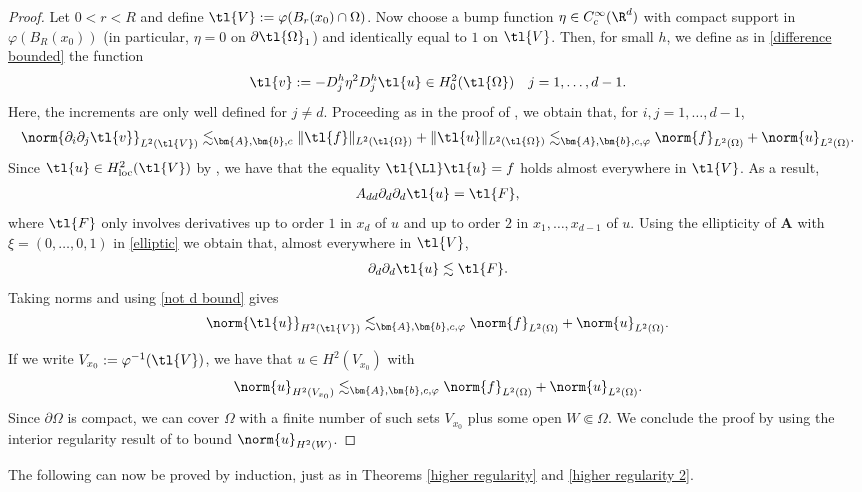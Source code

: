 \documentclass[
    a4paper,
    DIV=14,
    abstract=true,
    numbers=noenddot
]{scrartcl}
\begin{document}
\begin{proof}
    Let $0<r<R$ and define  $\tl{V}:= \varphi(B_r(x_0) \cap \Omega )$. Now choose a bump function $\eta \in C_c^\infty(\R^d) $ with compact support in $\varphi (B_R(x_0))$ (in particular, $\eta =0$ on $\partial \tl{\Omega }_1 $) and identically equal to $1$ on $\tl{V}$. Then, for small $h$,  we define as in \eqref{difference bounded} the function
    \begin{align*}
        \tl{v} := -D_j^h \eta^2 D_j^h \tl{u} \in H^2_0(\tl{\Omega }) \quad j=1,\ldots,d-1.
    \end{align*}
    Here, the increments are only well defined for $j \neq d$. Proceeding as in the proof of , we obtain that, for $i,j=1,\ldots,d-1$,
    \begin{align}\label{not d bound}
        \norm{\partial_i \partial _j \tl{v}}_{L^2(\tl{V} )} \lesssim_{\bm{A}, \bm{b}, c} \|\tl{f}\|_{L^2(\tl{\Omega })}+\|\tl{u}\|_{L^2(\tl{\Omega })} \lesssim_{\bm{A}, \bm{b}, c, \varphi } \norm{f}_{L^2(\Omega)}+\norm{u}_{L^2(\Omega)}.
    \end{align}
    Since $\tl{u} \in H^2_{\mathrm{loc}}(\tl{V} )$ by , we have that the equality $\tl{\Ll }\tl{u}=f  $ holds almost everywhere in $\tl{V} $. As a result,
    \begin{align*}
        A_{dd} \partial_d\partial_d \tl{u}= \tl{F},
    \end{align*}
    where $\tl{F}$ only involves derivatives up to order $1$ in $x_d$ of $u$ and up to order $2$ in $x_1,\dots, x_{d-1}$ of $u$. Using  the ellipticity of $\bm{A}$ with $\xi=(0,\dots,0,1)$ in \eqref{elliptic} we obtain that, almost everywhere in $\tl{V} $,
    \begin{align*}
        \partial_d\partial_d \tl{u} \lesssim \tl{F}.
    \end{align*}
    Taking norms and using \eqref{not d bound} gives
    \begin{align*}
        \norm{\tl{u} }_{H^2(\tl{V} )} \lesssim_{\bm{A},\bm{b},c, \varphi } \norm{f}_{L^2(\Omega)}+\norm{u }_{L^2(\Omega)}.
    \end{align*}


    If we write $V_{x_0}:= \varphi ^{-1} (\tl{V} )$, we have that $u \in H^2(V_{x_0})$ with
    \begin{align*}
        \norm{u}_{H^2(V_{x_0})} \lesssim_{\bm{A},\bm{b},c, \varphi } \norm{f}_{L^2(\Omega)}+\norm{u}_{L^2(\Omega)}.
    \end{align*}
    Since $\partial \Omega $ is compact, we can cover $\Omega $  with a finite number of such sets $V_{x_0}$ plus some open $W \Subset \Omega $. We conclude the proof by using the interior regularity result of  to bound $\norm{u}_{H^2(W)}$.
\end{proof}
The following can now be proved by induction, just as in Theorems \ref{higher regularity} and \ref{higher regularity 2}.
\end{document}
